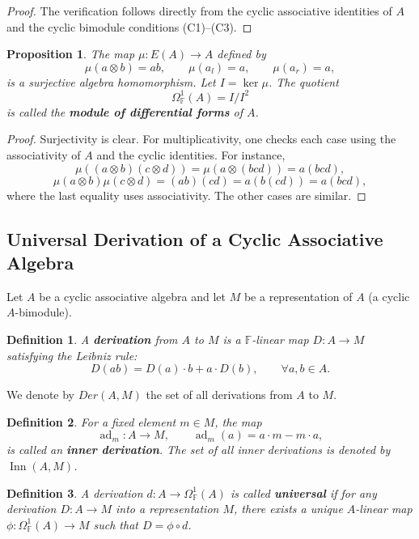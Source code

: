 \documentclass[pdflatex,sn-mathphys-num]{sn-jnl}%
\theoremstyle{thmstyleone}%
\newtheorem{proposition}[theorem]{Proposition}%
\newtheorem{definition}{Definition}[section]
\theoremstyle{thmstyletwo}%
\theoremstyle{thmstylethree}%
\begin{document}
\begin{proof}
The verification follows directly from the cyclic associative identities of $A$ and the cyclic bimodule conditions (C1)--(C3). 
\end{proof}

\begin{proposition}\label{prop:augmentation}
The map $\mu: E(A) \to A$ defined by
\[
\mu(a \otimes b) = ab, \qquad \mu(a_l) = a, \qquad \mu(a_r) = a,
\]
is a surjective algebra homomorphism. Let $I = \ker \mu$. The quotient
\[
\Omega^1_{\mathbb{F}}(A) = I / I^2
\]
is called the \textbf{module of differential forms} of $A$.
\end{proposition}

\begin{proof}
Surjectivity is clear. For multiplicativity, one checks each case using the associativity of $A$ and the cyclic identities. For instance,
\[
\mu((a \otimes b)(c \otimes d)) = \mu(a \otimes (b c d)) = a(b c d),
\]
\[
\mu(a \otimes b)\mu(c \otimes d) = (ab)(cd) = a(b(cd)) = a(b c d),
\]
where the last equality uses associativity. The other cases are similar. 
\end{proof}
\subsection{Universal Derivation of a Cyclic Associative Algebra}

Let $A$ be a cyclic associative algebra and let $M$ be a representation of $A$ (a cyclic $A$-bimodule).

\begin{definition}\label{def:derivation}
A \textbf{derivation} from $A$ to $M$ is a $\mathbb{F}$-linear map $D: A \to M$ satisfying the Leibniz rule:
\[
D(ab) = D(a) \cdot b + a \cdot D(b), \qquad \forall a, b \in A.
\]
\end{definition}
We denote by $Der(A,M)$ the set of all derivations from $A$ to $M$.
\begin{definition}\label{def:inner_derivation}
For a fixed element $m \in M$, the map
\[
\operatorname{ad}_m: A \to M, \qquad \operatorname{ad}_m(a) = a \cdot m - m \cdot a,
\]
is called an \textbf{inner derivation}. The set of all inner derivations is denoted by $\operatorname{Inn}(A, M)$.
\end{definition}

\begin{definition}\label{def:universal_derivation}
A derivation $d: A \to \Omega^1_{\mathbb{F}}(A)$ is called \textbf{universal} if for any derivation $D: A \to M$ into a representation $M$, there exists a unique $A$-linear map $\phi: \Omega^1_{\mathbb{F}}(A) \to M$ such that $D = \phi \circ d$.
\end{definition}
\end{document}
